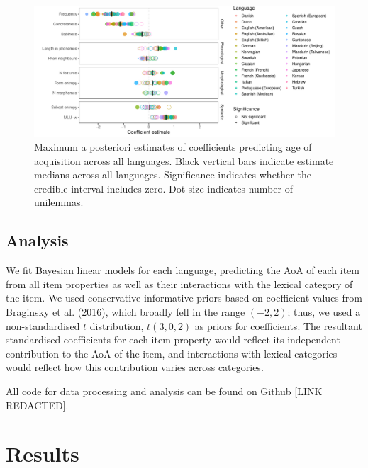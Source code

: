 \documentclass[10pt, letterpaper]{article}
\newenvironment{CodeChunk}{}{}
\begin{document}
\begin{CodeChunk}
\begin{figure}[ht]

{\centering \includegraphics[width=500px]{figs/big_plot-1}

}

\caption[Maximum a posteriori estimates of coefficients predicting age of acquisition across all languages]{Maximum a posteriori estimates of coefficients predicting age of acquisition across all languages. Black vertical bars indicate estimate medians across all languages. Significance indicates whether the credible interval includes zero. Dot size indicates number of unilemmas.}\label{fig:big_plot}
\end{figure}
\end{CodeChunk}

\hypertarget{analysis}{%
\subsection{Analysis}\label{analysis}}

We fit Bayesian linear models for each language, predicting the AoA of
each item from all item properties as well as their interactions with
the lexical category of the item. We used conservative informative
priors based on coefficient values from Braginsky et al. (2016), which
broadly fell in the range \((-2, 2)\); thus, we used a non-standardised
\(t\) distribution, \(t(3, 0, 2)\) as priors for coefficients. The
resultant standardised coefficients for each item property would reflect
its independent contribution to the AoA of the item, and interactions
with lexical categories would reflect how this contribution varies
across categories.

All code for data processing and analysis can be found on Github {[}LINK
REDACTED{]}.

\hypertarget{results}{%
\section{Results}\label{results}}
\end{document}
